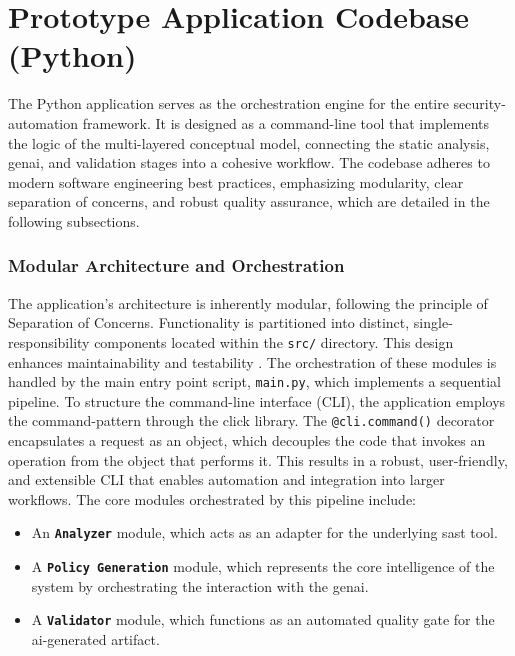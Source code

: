 \section{Prototype Application Codebase (Python)}

The Python application serves as the \gls{orchestration} engine for the entire \gls{security-automation} framework. It is designed as a command-line tool that implements the logic of the multi-layered conceptual model, connecting the static analysis, \gls{genai}, and validation stages into a cohesive workflow. The codebase adheres to modern software engineering best practices, emphasizing modularity, clear separation of concerns, and robust quality assurance, which are detailed in the following subsections.

\subsubsection{Modular Architecture and Orchestration}

The application's architecture is inherently modular, following the principle of Separation of Concerns. Functionality is partitioned into distinct, single-responsibility components located within the \texttt{src/} directory. This design enhances maintainability and testability \cite{martin_clean_2009}. The \gls{orchestration} of these modules is handled by the main entry point script, \texttt{main.py}, which implements a sequential pipeline. To structure the command-line interface (CLI), the application employs the \gls{command-pattern} through the click library. The \texttt{@cli.command()} decorator encapsulates a request as an object, which decouples the code that invokes an operation from the object that performs it. This results in a robust, user-friendly, and extensible CLI that enables automation and integration into larger workflows. The core modules orchestrated by this pipeline include:

\begin{itemize}
\item An \textbf{\texttt{Analyzer}} module, which acts as an adapter for the underlying \gls{sast} tool.
\item A \textbf{\texttt{Policy Generation}} module, which represents the core intelligence of the system by orchestrating the interaction with the \gls{genai}.
\item A \textbf{\texttt{Validator}} module, which functions as an automated quality gate for the \gls{ai}-generated artifact.
\end{itemize}

